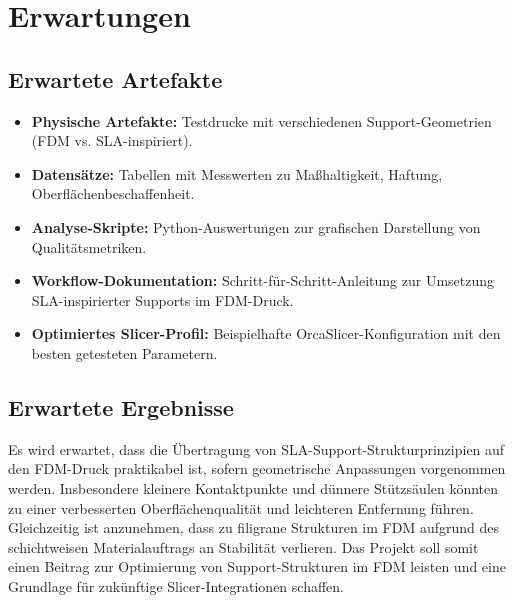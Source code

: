 \chapter{Erwartungen}
\label{cha:Erwartungen}

\section{Erwartete Artefakte}
\begin{itemize}
  \item \textbf{Physische Artefakte:} Testdrucke mit verschiedenen Support-Geometrien (FDM vs. SLA-inspiriert).  
  \item \textbf{Datensätze:} Tabellen mit Messwerten zu Maßhaltigkeit, Haftung, Oberflächenbeschaffenheit.  
  \item \textbf{Analyse-Skripte:} Python-Auswertungen zur grafischen Darstellung von Qualitätsmetriken.  
  \item \textbf{Workflow-Dokumentation:} Schritt-für-Schritt-Anleitung zur Umsetzung SLA-inspirierter Supports im FDM-Druck.  
  \item \textbf{Optimiertes Slicer-Profil:} Beispielhafte OrcaSlicer-Konfiguration mit den besten getesteten Parametern.
\end{itemize}

\section{Erwartete Ergebnisse}
Es wird erwartet, dass die Übertragung von SLA-Support-Strukturprinzipien auf den FDM-Druck praktikabel ist, sofern geometrische Anpassungen vorgenommen werden.  
Insbesondere kleinere Kontaktpunkte und dünnere Stützsäulen könnten zu einer verbesserten Oberflächenqualität und leichteren Entfernung führen.  
Gleichzeitig ist anzunehmen, dass zu filigrane Strukturen im FDM aufgrund des schichtweisen Materialauftrags an Stabilität verlieren.  
Das Projekt soll somit einen Beitrag zur Optimierung von Support-Strukturen im FDM leisten und eine Grundlage für zukünftige Slicer-Integrationen schaffen.